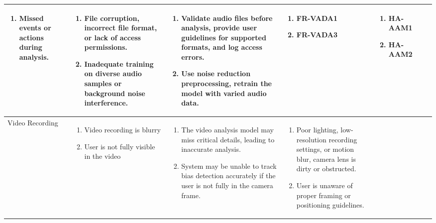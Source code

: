 \documentclass{article}
\begin{document}
\begin{landscape}
\begin{longtable}{|p{3cm}|p{3cm}|p{4cm}|p{4cm}|p{3cm}|p{2cm}|p{3cm}|}
\begin{enumerate}[leftmargin=*]
      \item Missed events or actions during analysis.
  \end{enumerate} &
  \begin{enumerate}[leftmargin=*]
       \item File corruption, incorrect file format, or lack of access permissions.
       \item Inadequate training on diverse audio samples or background noise interference.
  \end{enumerate} &
  \begin{enumerate}[leftmargin=*]
       \item Validate audio files before analysis, provide user guidelines for supported formats, and log access errors.
       \item Use noise reduction preprocessing, retrain the model with varied audio data.
  \end{enumerate} &
  \begin{enumerate}[leftmargin=*]
       \item FR-VADA1
       \item FR-VADA3
  \end{enumerate} &
  \begin{enumerate}[leftmargin=*]
       \item HA-AAM1
       \item HA-AAM2
  \end{enumerate} \\
  \hline
  Video Recording & 
  \begin{enumerate}[leftmargin=*]
      \item Video recording is blurry
      \item User is not fully visible in the video
  \end{enumerate} & 
  \begin{enumerate}[leftmargin=*]
      \item The video analysis model may miss critical details, leading to inaccurate analysis.
      \item System may be unable to track bias detection accurately if the user is not fully in the camera frame.
  \end{enumerate} &
  \begin{enumerate}[leftmargin=*]
       \item Poor lighting, low-resolution recording settings, or motion blur, camera lens is dirty or obstructed.
       \item User is unaware of proper framing or positioning guidelines.

\end{enumerate}
\end{longtable}
\end{landscape}
\end{document}
